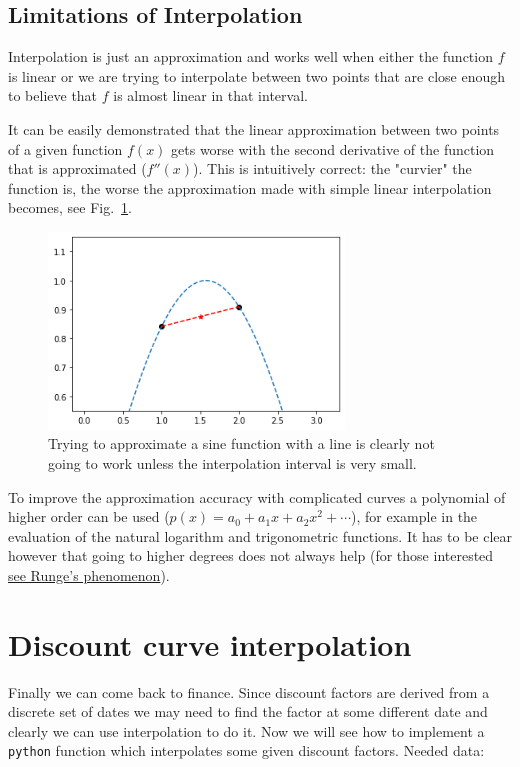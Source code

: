 \subsection{Limitations of Interpolation}
Interpolation is just an approximation and works well when either the function $f$ is linear or we are trying to interpolate between two points that are close enough to believe that $f$ is almost linear in that interval.

It can be easily demonstrated that the linear approximation between two points of a given function $f(x)$ gets worse with the second derivative of the function that is approximated ($f''(x)$). This is intuitively correct: the "curvier" the function is, the worse the approximation made with simple linear interpolation becomes, see Fig.~\ref{fig:sine_interp}.

\begin{figure}
  \centering
  \includegraphics[width=0.7\textwidth]{wrong_interp.png}
  \caption{Trying to approximate a sine function with a line is clearly not going to work unless the interpolation interval is very small.}
  \label{fig:sine_interp}
\end{figure}

To improve the approximation accuracy with complicated curves a polynomial of higher order can be used ($𝑝(𝑥)=𝑎_0 + 𝑎_1 𝑥+ 𝑎_2 𝑥^2+\cdots$), for example in the evaluation of the natural logarithm and trigonometric functions. It has to be clear however that going to higher degrees does not always help (for those interested \href{https://en.wikipedia.org/wiki/Runge%27s_phenomenon}{see Runge's phenomenon}).

\section{Discount curve interpolation}\label{discount-curve-interpolation}

Finally we can come back to finance. Since discount factors are derived from a discrete set of dates we may need to find the factor at some different date and clearly we can use interpolation to do it.
Now we will see how to implement a \texttt{python} function which interpolates some given discount factors.
Needed data:

